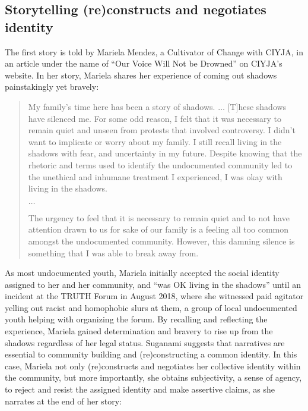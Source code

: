 \documentclass[12pt]{article}
\begin{document}
\begin{flushleft}
\subsection*{Storytelling (re)constructs and negotiates identity}


The first story is told by Mariela Mendez, a Cultivator of Change with CIYJA, in an article under the name of ``Our Voice Will Not be Drowned'' on CIYJA's website. In her story, Mariela shares her experience of coming out shadows painstakingly yet bravely:

\begin{quotation}
    \noindent
    My family's time here has been a story of shadows. $\ldots$ [T]hese shadows have silenced me.
    For some odd reason, I felt that it was necessary to remain quiet and unseen from protests that involved controversy. 
    I didn't want to implicate or worry about my family.
    I still recall living in the shadows with fear, and uncertainty in my future.
    Despite knowing that the rhetoric and terms used to identify the undocumented community led to the unethical and inhumane treatment I experienced, I was okay with living in the shadows.

    \noindent $\ldots$
    
    \noindent
    The urgency to feel that it is necessary to remain quiet and to not have attention drawn to us for sake of our family is a feeling all too common amongst the undocumented community.
    However, this damning silence is something that I was able to break away from.
\end{quotation} %

As most undocumented youth, Mariela initially accepted the social identity assigned to her and her community, and ``was OK living in the shadows'' until an incident at the TRUTH Forum in August 2018, where she witnessed paid agitator yelling out racist and homophobic slurs at them, a group of local undocumented youth helping with organizing the forum.
By recalling and reflecting the experience, Mariela gained determination and bravery to rise up from the shadows regardless of her legal status.
Suganami suggests that narratives are essential to community building and (re)constructing a common identity. %
In this case, Mariela not only (re)constructs and negotiates her collective identity within the community, but more importantly, she obtains subjectivity, a sense of agency, to reject and resist the assigned identity and make assertive claims, as she narrates at the end of her story:


\end{flushleft}
\end{document}
